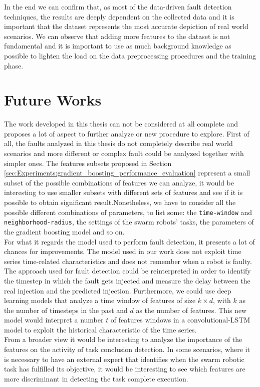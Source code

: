 \documentclass[../../Thesis.tex]{subfiles}
\begin{document}
		In the end we can confirm that, as most of the data-driven fault detection techniques, the results are deeply dependent on the collected data and it is important that the dataset represents the most accurate depiction of real world scenarios. We can observe that adding more features to the dataset is not fundamental and it is important to use as much background knowledge as possible to lighten the load on the data preprocessing procedures and the training phase.
	\section{Future Works}
		The work developed in this thesis can not be considered at all complete and proposes a lot of aspect to further analyze or new procedure to explore.  First of all, the faults analyzed in this thesis do not completely describe real world scenarios and more different or complex fault could be analyzed together with simpler ones. The features subsets proposed in Section \ref{sec:Experiments:gradient_boosting_performance_evaluation} represent a small subset of the possible combinations of features we can analyze, it would be interesting to use smaller subsets with different sets of features and see if it is possible to obtain significant result.Nonetheless, we have to consider all the possible different combinations of parameters, to list some: the \verb|time-window| and \verb|neighborhood-radius|, the settings of the swarm robots' tasks, the parameters of the gradient boosting model and so on.\\
		For what it regards the model used to perform fault detection, it presents a lot of chances for improvements. The model used in our work does not exploit time series time-related characteristics and does not remember when a robot is faulty. The approach used for fault detection could be reinterpreted in order to identify the timestep in which the fault gets injected and measure the delay between the real injection and the predicted injection. Furthermore, we could use deep learning models that analyze a time window of features of size $k \times d$, with $k$ as the number of timesteps in the past and $d$ as the number of features. This new model would interpret a number $t$ of features windows in a convolutional-LSTM model to exploit the historical characteristic of the time series.\\
		From a broader view it would be interesting to analyze the importance of the features on the activity of task conclusion detection. In some scenarios, where it is necessary to have an external expert that identifies when the swarm robotic task has fulfilled its objective, it would be interesting to see which features are more discriminant in detecting the task complete execution.\\
\end{document}
